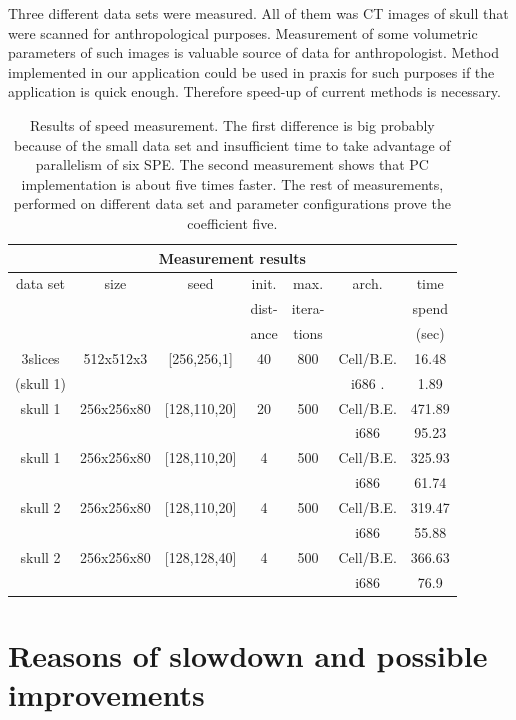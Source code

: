 \par
Three different data sets were measured.
All of them was CT images of skull that were scanned for anthropological purposes.
Measurement of some volumetric parameters of such images is valuable source of data for anthropologist.
Method implemented in our application could be used in praxis for such purposes if the application is quick enough.
Therefore speed-up of current methods is necessary.

\begin{table}
\centering
\begin{tabular}{|c|c|c|c|c|c|c|}
\hline
\multicolumn{7}{|c|}{Measurement results}\\
\hline
data set		&size		&seed		&init.		&max. 		&arch.		&time\\
			&		&		&dist-		&itera-		&		&spend\\
			&		&		&ance		&tions		&		&(sec)\\
\hline
\hline
3slices 		&512x512x3	&[256,256,1]	&40		&800		&\mbox{Cell/B.E.}	&16.48\\
(skull 1)		&		&		&		&		&i686	.	&1.89\\
\hline
\hline
skull 1			&256x256x80	&[128,110,20]	&20		&500		&\mbox{Cell/B.E.}	&471.89\\
			&		&		&		&		&i686		&95.23\\
\hline
\hline
skull 1			&256x256x80	&[128,110,20]	&4		&500		&\mbox{Cell/B.E.}	&325.93\\
			&		&		&		&		&i686		&61.74\\
\hline
\hline
skull 2			&256x256x80	&[128,110,20]	&4		&500		&\mbox{Cell/B.E.}	&319.47\\
			&		&		&		&		&i686		&55.88\\
\hline
\hline
skull 2			&256x256x80	&[128,128,40]	&4		&500		&\mbox{Cell/B.E.}	&366.63\\
			&		&		&		&		&i686		&76.9\\
\hline
\end{tabular}
\par
\caption[Measurement results]
{
Results of speed measurement.
The first difference is big probably because of the small data set and insufficient time to take advantage of parallelism of six SPE.
The second measurement shows that PC implementation is about five times faster.
The rest of measurements, performed on different data set and parameter configurations prove the coefficient five.
}
\label{tab:runresults}
\end{table}

\section{Reasons of slowdown and possible improvements}

